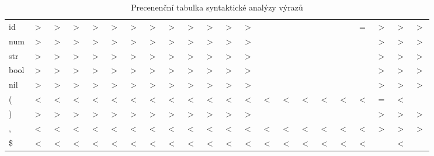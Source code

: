 \begin{sidewaystable}
\begin{tabular}{l | c c c c c c c c c c c c c c c c c c c c c}
  id    & $>$ & $>$ & $>$ & $>$ & $>$ & $>$ & $>$ & $>$ & $>$  & $>$  & $>$  & $>$  &    &     &     &      &     & =  & $>$  & $>$  & $>$ \\
  num   & $>$ & $>$ & $>$ & $>$ & $>$ & $>$ & $>$ & $>$ & $>$  & $>$  & $>$  & $>$  &    &     &     &      &     &    & $>$  & $>$  & $>$ \\
  str   & $>$ & $>$ & $>$ & $>$ & $>$ & $>$ & $>$ & $>$ & $>$  & $>$  & $>$  & $>$  &    &     &     &      &     &    & $>$  & $>$  & $>$ \\
  bool  & $>$ & $>$ & $>$ & $>$ & $>$ & $>$ & $>$ & $>$ & $>$  & $>$  & $>$  & $>$  &    &     &     &      &     &    & $>$  & $>$  & $>$ \\
  nil   & $>$ & $>$ & $>$ & $>$ & $>$ & $>$ & $>$ & $>$ & $>$  & $>$  & $>$  & $>$  &    &     &     &      &     &    & $>$  & $>$  & $>$ \\
  (     & $<$ & $<$ & $<$ & $<$ & $<$ & $<$ & $<$ & $<$ & $<$  & $<$  & $<$  & $<$  & $<$  & $<$   & $<$   & $<$    &  $<$  & $<$  & =  & $<$  &   \\
  )     & $>$ & $>$ & $>$ & $>$ & $>$ & $>$ & $>$ & $>$ & $>$  & $>$  & $>$  & $>$  &    &     &     &      &     &    & $>$  & $>$  & $>$ \\
  ,     & $<$ & $<$ & $<$ & $<$ & $<$ & $<$ & $<$ & $<$ & $<$  & $<$  & $<$  & $<$  & $<$  & $<$   & $<$   & $<$    &  $<$  & $<$  & $>$  & $>$  & $>$ \\
  \$    & $<$ & $<$ & $<$ & $<$ & $<$ & $<$ & $<$ & $<$ & $<$  & $<$  & $<$  & $<$  & $<$  & $<$   & $<$   & $<$    &  $<$  & $<$  &    & $<$  &   \\
\end{tabular}
\caption{Precenenční tabulka syntaktické analýzy výrazů}
\label{tab.prec}
\end{sidewaystable} 
